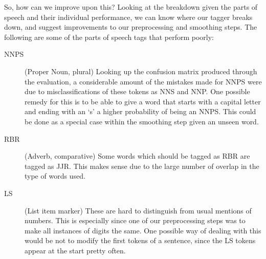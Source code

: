 \documentclass[12pt]{homework}
\begin{document}
So, how can we improve upon this? Looking at the breakdown given the parts of 
speech and their individual performance, we can know where our tagger breaks 
down, and suggest improvements to our preprocessing and smoothing steps. The 
following are some of the parts of speech tags that perform poorly:
\begin{description}
	\item[NNPS] (Proper Noun, plural) Looking up the confusion matrix produced 
		through the evaluation, a considerable amount of the mistakes made for 
		NNPS were due to misclassifications of these tokens as NNS and NNP. One 
		possible remedy for this is to be able to give a word that starts with a 
		capital letter and ending with an `s' a higher probability of being an 
		NNPS. This could be done as a special case within the smoothing step 
		given an unseen word.
	\item[RBR] (Adverb, comparative) Some words which should be tagged as RBR 
		are tagged as JJR. This makes sense due to the large number of overlap 
		in the type of words used.
	\item[LS] (List item marker) These are hard to distinguish from usual 
		mentions of numbers. This is especially since one of our preprocessing 
		steps was to make all instances of digits the same. One possible way of 
		dealing with this would be not to modify the first tokens of a sentence, 
		since the LS tokens appear at the start pretty often.
\end{description}
\end{document}
